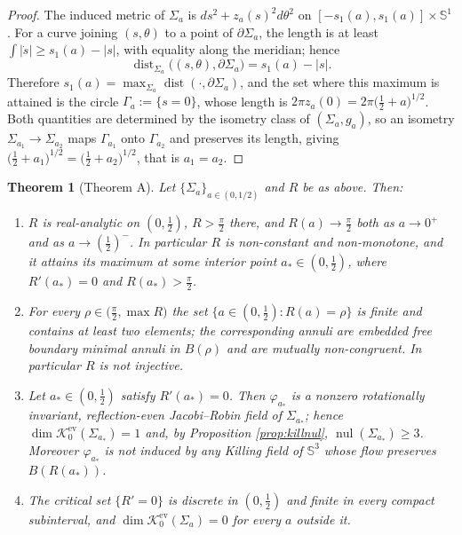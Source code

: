 \documentclass[10pt,a4paper]{amsart}
\newtheorem{theorem}{Theorem}[section]
\newcommand{\Sph}{\mathbb{S}}
\newcommand{\nul}{\operatorname{nul}}
\newcommand{\dist}{\operatorname{dist}}
\newcommand{\Ker}{\mathcal{K}}
\begin{document}
\begin{proof}
The induced metric of $\Sigma_a$ is $ds^2+z_a(s)^2d\theta^2$ on $[-s_1(a),s_1(a)]\times\Sph^1$. For a curve joining $(s,\theta)$ to a point of $\partial\Sigma_a$, the length is at least $\int|\dot s|\geq s_1(a)-|s|$, with equality along the meridian; hence
\[
\dist_{\Sigma_a}\bigl((s,\theta),\partial\Sigma_a\bigr)=s_1(a)-|s| .
\]
Therefore $s_1(a)=\max_{\Sigma_a}\dist(\cdot,\partial\Sigma_a)$, and the set where this maximum is attained is the circle $\Gamma_a:=\{s=0\}$, whose length is $2\pi z_a(0)=2\pi\bigl(\tfrac12+a\bigr)^{1/2}$. Both quantities are determined by the isometry class of $(\Sigma_a,g_a)$, so an isometry $\Sigma_{a_1}\to\Sigma_{a_2}$ maps $\Gamma_{a_1}$ onto $\Gamma_{a_2}$ and preserves its length, giving $\bigl(\tfrac12+a_1\bigr)^{1/2}=\bigl(\tfrac12+a_2\bigr)^{1/2}$, that is $a_1=a_2$.
\end{proof}

\begin{theorem}[Theorem A]\label{thm:main}
Let $\{\Sigma_a\}_{a\in(0,1/2)}$ and $R$ be as above. Then:
\begin{enumerate}
\item[\textup{(i)}] $R$ is real-analytic on $(0,\tfrac12)$, $R>\tfrac\pi2$ there, and $R(a)\to\tfrac\pi2$ both as $a\to 0^+$ and as $a\to(\tfrac12)^-$. In particular $R$ is non-constant and non-monotone, and it attains its maximum at some interior point $a_*\in(0,\tfrac12)$, where $R'(a_*)=0$ and $R(a_*)>\tfrac\pi2$.
\item[\textup{(ii)}] For every $\rho\in\bigl(\tfrac\pi2,\max R\bigr)$ the set $\{a\in(0,\tfrac12):R(a)=\rho\}$ is finite and contains at least two elements; the corresponding annuli are embedded free boundary minimal annuli in $B(\rho)$ and are mutually non-congruent. In particular $R$ is not injective.
\item[\textup{(iii)}] Let $a_*\in(0,\tfrac12)$ satisfy $R'(a_*)=0$. Then $\varphi_{a_*}$ is a nonzero rotationally invariant, reflection-even Jacobi--Robin field of $\Sigma_{a_*}$; hence $\dim\Ker_0^{\mathrm{ev}}(\Sigma_{a_*})=1$ and, by Proposition \ref{prop:killnul}, $\nul(\Sigma_{a_*})\geq 3$. Moreover $\varphi_{a_*}$ is not induced by any Killing field of $\Sph^3$ whose flow preserves $B(R(a_*))$.
\item[\textup{(iv)}] The critical set $\{R'=0\}$ is discrete in $(0,\tfrac12)$ and finite in every compact subinterval, and $\dim\Ker_0^{\mathrm{ev}}(\Sigma_a)=0$ for every $a$ outside it.
\end{enumerate}
\end{theorem}
\end{document}

